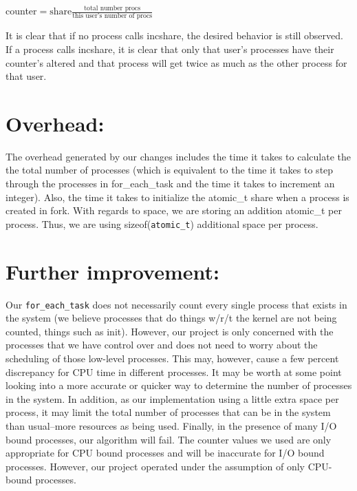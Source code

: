 \documentclass[10pt]{article}
\begin{document}
counter$ = \text{share}\frac{\text{total number procs}}{\text{this user's number of procs}}$

It is clear that if no process calls incshare, the desired behavior is still observed. If a process calls incshare, it is clear that only that user's processes have their counter's altered and that process will get twice as much as the other process for that user.

\section{Overhead:}

The overhead generated by our changes includes the time it takes to calculate the the total number of processes (which is equivalent to the time it takes to step through the processes in for\_each\_task and the time it takes to increment an integer). Also, the time it takes to initialize the atomic\_t share when a process is created in fork. With regards to space, we are storing an addition atomic\_t per process. Thus, we are using sizeof(\texttt{atomic\_t}) additional space per process.

\section{Further improvement:}

Our \texttt{for\_each\_task} does not necessarily count every single process that exists in the system (we believe processes that do things w/r/t the kernel are not being counted, things such as init). However, our project is only concerned with the processes that we have control over and does not need to worry about the scheduling of those low-level processes. This may, however, cause a few percent discrepancy for CPU time in different processes. It may be worth at some point looking into a more accurate or quicker way to determine the number of processes in the system. In addition, as our implementation using a little extra space per process, it may limit the total number of processes that can be in the system than usual--more resources as being used. Finally, in the presence of many I/O bound processes, our algorithm will fail. The counter values we used are only appropriate for CPU bound processes and will be inaccurate for I/O bound processes. However, our project operated under the assumption of only CPU-bound processes.
\end{document}
